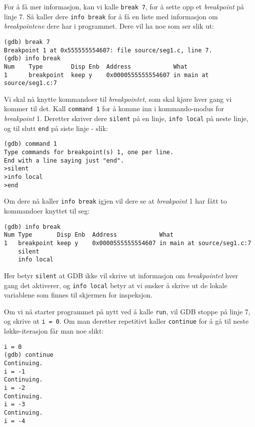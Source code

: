 For å få mer informasjon, kan vi kalle \verb|break 7|, for å sette opp et \textit{breakpoint} på linje 7. Så kaller dere \verb|info break| for å få en liste med informasjon om \textit{breakpointene} dere har i programmet. Dere vil ha noe som ser slik ut:

\begin{lstlisting}[mathescape=true,keywordstyle=\color{black}]
(gdb) break 7
Breakpoint 1 at 0x555555554607: file source/seg1.c, line 7.
(gdb) info break
Num    Type        Disp Enb  Address            What
1      breakpoint  keep y    0x0000555555554607 in main at source/seg1.c:7
\end{lstlisting}


Vi skal nå knytte kommandoer til \textit{breakpointet}, som skal kjøre hver gang vi kommer til det. Kall \verb|command 1| for å komme inn i kommando-modus for \textit{breakpoint} 1. Deretter skriver dere \verb|silent| på en linje, \verb|info local| på neste linje, og til slutt \verb|end| på siste linje - slik:

\begin{lstlisting}[mathescape=true,keywordstyle=\color{black}]
(gdb) command 1
Type commands for breakpoint(s) 1, one per line.
End with a line saying just "end".
>silent
>info local
>end
\end{lstlisting}


Om dere nå kaller \verb|info break| igjen vil dere se at \textit{breakpoint} 1 har fått to kommandoer knyttet til seg:

\begin{lstlisting}[mathescape=true,keywordstyle=\color{black}]
(gdb) info break
Num Type       Disp Enb  Address            What
1   breakpoint keep y    0x0000555555554607 in main at source/seg1.c:7
    silent
    info local
\end{lstlisting}



Her betyr \verb|silent| at GDB ikke vil skrive ut informasjon om \textit{breakpointet} hver gang det aktiverer, og \verb|info local| betyr at vi ønsker å skrive ut de lokale variablene som finnes til skjermen for inspeksjon. 

Om vi nå starter programmet på nytt ved å kalle \verb|run|, vil GDB stoppe på linje 7, og skrive ut \verb|i = 0|. Om man deretter repetitivt kaller \verb|continue| for å gå til neste løkke-iterasjon får man noe slikt:

\begin{lstlisting}[mathescape=true,keywordstyle=\color{black}]
i = 0
(gdb) continue
Continuing.
i = -1
Continuing.
i = -2
Continuing.
i = -3
Continuing.
i = -4

\end{lstlisting}


